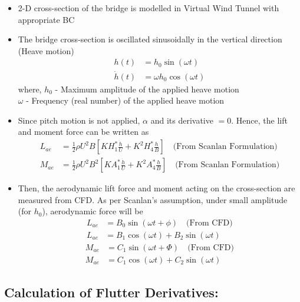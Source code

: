 \documentclass[a4paper, 12pt]{report}
\begin{document}
\begin{itemize}
    \setlength{\itemsep}{10pt}
    \item[$\bullet$] 2-D cross-section of the bridge is modelled in Virtual Wind Tunnel with appropriate BC

    \item[$\bullet$] The bridge cross-section is oscillated sinusoidally in the vertical direction (Heave motion)
    \begin{align}
        h(t)        &= h_0 \sin(\omega t) \\
        \dot{h}(t)  &= \omega h_0 \cos(\omega t)
    \end{align}
    where, $h_0$ - Maximum amplitude of the applied heave motion \\
    \phantom{where,} $\omega$ - Frequency (real number) of the applied heave motion

    \item[$\bullet$] Since pitch motion is not applied, $\alpha$ and its derivative $= 0$. Hence, the lift and moment force can be written as
    \begin{align}
        L_{ae} &= \frac{1}{2}\rho U^2 B \left[KH_1^* \frac{\dot{h}}{U} + K^2H_4^* \frac{h}{B}\right] \quad \text{(From Scanlan Formulation)} \\
        M_{ae} &= \frac{1}{2}\rho U^2 B^2 \left[KA_1^* \frac{\dot{h}}{U} + K^2A_4^* \frac{h}{B}\right] \quad \text{(From Scanlan Formulation)}
    \end{align}

    \item[$\bullet$] Then, the aerodynamic lift force and moment acting on the cross-section are measured from CFD. As per Scanlan's assumption, under small amplitude (for $h_0$), aerodynamic force will be
    \begin{align}
        L_{ae} &= B_0 \sin(\omega t + \phi) \quad \text{(From CFD)} \\
        L_{ae} &= B_1 \cos(\omega t) + B_2 \sin(\omega t)
    \end{align}
    \begin{align}
        M_{ae} &= C_1 \sin(\omega t + \Phi) \quad \text{(From CFD)} \\
        M_{ae} &= C_1 \cos(\omega t) + C_2 \sin(\omega t)
    \end{align}
\end{itemize}

\vspace{0.5cm}

\subsection*{Calculation of Flutter Derivatives:}
\end{document}
